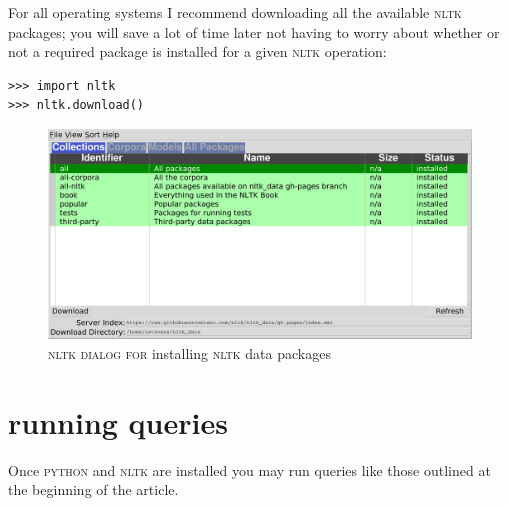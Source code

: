 For all operating systems I recommend downloading all the available
\textsc{nltk} packages; you will save a lot of time later not having to
worry about whether or not a required package is installed for a given
\textsc{nltk} operation:
\begin{lstlisting}
>>> import nltk
>>> nltk.download()
\end{lstlisting}
\begin{figure}[ht]
\centering
\includegraphics[width=\textwidth]{media/images/nltk_data.png}
  \caption{\textsc{nltk dialog for} installing \textsc{nltk} data packages}
\end{figure}
\section{running queries}
Once \textsc{python} and \textsc{nltk} are installed you may run queries like
those outlined at the beginning of the article.

